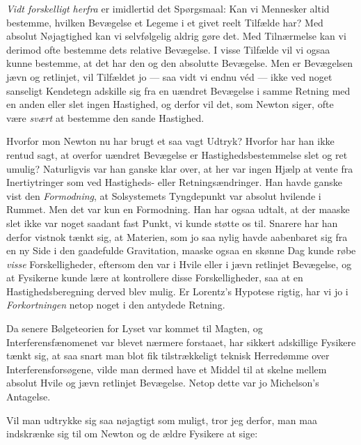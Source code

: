 \documentclass[12pt,a4paper]{article}
\newcommand{\opage}[1]{\marginnote{\footnotesize\textit{[#1]}}}
\begin{document}
\opage{196} \emph{Vidt forskelligt herfra} er imidlertid det Spørgsmaal: Kan vi Mennesker
altid bestemme, hvilken Bevægelse et Legeme i et givet reelt Tilfælde har? Med
absolut Nøjagtighed kan vi selvfølgelig aldrig gøre det. Med Tilnærmelse kan vi
derimod ofte bestemme dets relative Bevægelse. I visse Tilfælde vil vi ogsaa
kunne bestemme, at det har den og den absolutte Bevægelse. Men er Bevægelsen
jævn og retlinjet, vil Tilfældet jo --- saa vidt vi endnu véd --- ikke ved
noget sanseligt Kendetegn adskille sig fra en uændret Bevægelse i samme Retning
med en anden eller slet ingen Hastighed, og derfor vil det, som Newton siger,
ofte være \emph{svært} at bestemme den sande Hastighed.

Hvorfor mon Newton nu har brugt et saa vagt Udtryk? Hvorfor har han ikke
rentud sagt, at overfor uændret Bevægelse er Hastighedsbestemmelse slet og ret
umulig? Naturligvis var han ganske klar over, at her var ingen Hjælp at vente
fra Inertiytringer som ved Hastigheds- eller Retningsændringer. Han havde
ganske vist den \emph{Formodning}, at Solsystemets Tyngdepunkt var absolut
hvilende i Rummet. Men det var kun en Formodning. Han har ogsaa udtalt, at der
maaske slet ikke var noget saadant fast Punkt, vi kunde støtte os til. Snarere
har han derfor vistnok tænkt sig, at Materien, som jo saa nylig havde aabenbaret
sig fra en ny Side i den gaadefulde Gravitation, maaske ogsaa en skønne Dag
kunde røbe \emph{visse} Forskelligheder, eftersom den var i Hvile eller i jævn
retlinjet Bevægelse, og at Fysikerne kunde lære at kontrollere disse
Forskelligheder, saa at en Hastighedsberegning derved blev mulig. Er Lorentz's
Hypotese rigtig, har vi jo i \emph{Forkortningen} netop noget i den antydede
Retning.

Da senere Bølgeteorien for Lyset var kommet til Magten, og
Interferensfænomenet var blevet nærmere forstaaet, har sikkert adskillige
Fysikere tænkt sig, at saa snart man blot fik tilstrækkeligt teknisk
Herredømme over Interferensforsøgene, vilde man dermed have et Middel til at
skelne mellem absolut Hvile og jævn retlinjet Bevægelse. Netop dette var jo
Michelson's Antagelse.

Vil man udtrykke sig saa nøjagtigt som muligt, tror jeg derfor, man maa
indskrænke sig til om Newton og de ældre Fysikere at sige:
\end{document}
